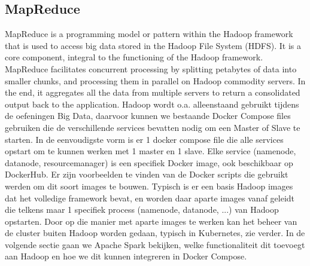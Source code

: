 \subsection{MapReduce}
MapReduce is a programming model or pattern within the Hadoop framework that is used to access big data stored in the Hadoop File System (HDFS). It is a core component, integral to the functioning of the Hadoop framework.
MapReduce facilitates concurrent processing by splitting petabytes of data into smaller chunks, and processing them in parallel on Hadoop commodity servers. In the end, it aggregates all the data from multiple servers to return a consolidated output back to the application.\autocite{Talend2023}
\newline
\newline
Hadoop wordt o.a. alleenstaand gebruikt tijdens de oefeningen Big Data, daarvoor kunnen we bestaande Docker Compose files gebruiken die de verschillende services bevatten nodig om een Master of Slave te starten.
In de eenvoudigste vorm is er 1 docker compose file die alle services opstart om te kunnen werken met 1 master en 1 slave.
\newline
\newline
Elke service (namenode, datanode, resourcemanager) is een specifiek Docker image, ook beschikbaar op DockerHub. Er zijn voorbeelden te vinden van de Docker scripts die gebruikt werden om dit soort images te bouwen. Typisch is er een basis Hadoop images dat het volledige framework bevat, en worden daar aparte images vanaf geleidt die telkens maar 1 specifiek process (namenode, datanode, ...) van Hadoop opstarten.
Door op die manier met aparte images te werken kan het beheer van de cluster buiten Hadoop worden gedaan, typisch in Kubernetes, zie verder.
\newline
\newline
In de volgende sectie gaan we Apache Spark bekijken, welke functionaliteit dit toevoegt aan Hadoop en hoe we dit kunnen integreren in Docker Compose.

